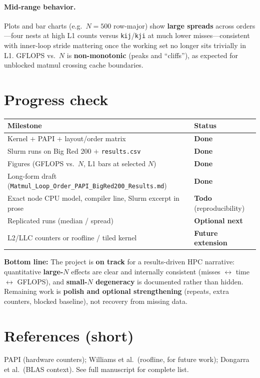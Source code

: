 \documentclass[11pt]{article}
\begin{document}
\paragraph{Mid-range behavior.}
Plots and bar charts (e.g.\ \textbf{$N=500$} row-major) show \textbf{large spreads} across orders---four nests at high L1 counts versus \texttt{kij}/\texttt{kji} at much lower misses---consistent with inner-loop stride mattering once the working set no longer sits trivially in L1. GFLOPS vs.\ $N$ is \textbf{non-monotonic} (peaks and ``cliffs''), as expected for unblocked matmul crossing cache boundaries.

\section*{Progress check}

\begin{table}[h]
\centering
\begin{tabular}{@{}ll@{}}
\toprule
\textbf{Milestone} & \textbf{Status} \\
\midrule
Kernel $+$ PAPI $+$ layout/order matrix & \textbf{Done} \\
Slurm runs on Big Red 200 $+$ \texttt{results.csv} & \textbf{Done} \\
Figures (GFLOPS vs.\ $N$, L1 bars at selected $N$) & \textbf{Done} \\
Long-form draft (\texttt{Matmul\_Loop\_Order\_PAPI\_BigRed200\_Results.md}) & \textbf{Done} \\
Exact node CPU model, compiler line, Slurm excerpt in prose & \textbf{Todo} (reproducibility) \\
Replicated runs (median / spread) & \textbf{Optional next} \\
L2/LLC counters or roofline / tiled kernel & \textbf{Future extension} \\
\bottomrule
\end{tabular}
\end{table}

\noindent\textbf{Bottom line:} The project is \textbf{on track} for a results-driven HPC narrative: quantitative \textbf{large-$N$} effects are clear and internally consistent (misses $\leftrightarrow$ time $\leftrightarrow$ GFLOPS), and \textbf{small-$N$ degeneracy} is documented rather than hidden. Remaining work is \textbf{polish and optional strengthening} (repeats, extra counters, blocked baseline), not recovery from missing data.

\section*{References (short)}
PAPI (hardware counters); Williams et al.\ (roofline, for future work); Dongarra et al.\ (BLAS context). See full manuscript for complete list.
\end{document}
